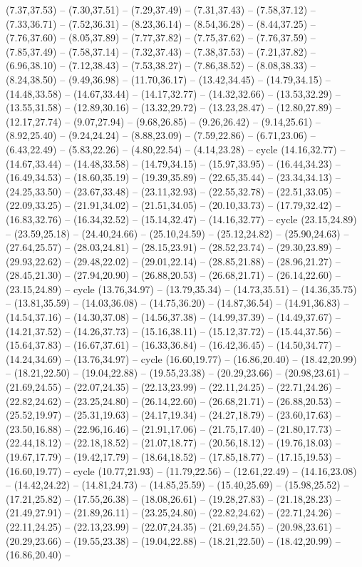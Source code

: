 {(7.37,37.53) -- (7.30,37.51) -- (7.29,37.49) -- (7.31,37.43) -- (7.58,37.12) -- (7.33,36.71) -- (7.52,36.31) -- (8.23,36.14) -- (8.54,36.28) -- (8.44,37.25) -- (7.76,37.60) -- (8.05,37.89) -- (7.77,37.82) -- (7.75,37.62) -- (7.76,37.59) -- (7.85,37.49) -- (7.58,37.14) -- (7.32,37.43) -- (7.38,37.53) -- (7.21,37.82) -- (6.96,38.10) -- (7.12,38.43) -- (7.53,38.27) -- (7.86,38.52) -- (8.08,38.33) -- (8.24,38.50) -- (9.49,36.98) -- (11.70,36.17) -- (13.42,34.45) -- (14.79,34.15) -- (14.48,33.58) -- (14.67,33.44) -- (14.17,32.77) -- (14.32,32.66) -- (13.53,32.29) -- (13.55,31.58) -- (12.89,30.16) -- (13.32,29.72) -- (13.23,28.47) -- (12.80,27.89) -- (12.17,27.74) -- (9.07,27.94) -- (9.68,26.85) -- (9.26,26.42) -- (9.14,25.61) -- (8.92,25.40) -- (9.24,24.24) -- (8.88,23.09) -- (7.59,22.86) -- (6.71,23.06) -- (6.43,22.49) -- (5.83,22.26) -- (4.80,22.54) -- (4.14,23.28) -- cycle (14.16,32.77) -- (14.67,33.44) -- (14.48,33.58) -- (14.79,34.15) -- (15.97,33.95) -- (16.44,34.23) -- (16.49,34.53) -- (18.60,35.19) -- (19.39,35.89) -- (22.65,35.44) -- (23.34,34.13) -- (24.25,33.50) -- (23.67,33.48) -- (23.11,32.93) -- (22.55,32.78) -- (22.51,33.05) -- (22.09,33.25) -- (21.91,34.02) -- (21.51,34.05) -- (20.10,33.73) -- (17.79,32.42) -- (16.83,32.76) -- (16.34,32.52) -- (15.14,32.47) -- (14.16,32.77) -- cycle (23.15,24.89) -- (23.59,25.18) -- (24.40,24.66) -- (25.10,24.59) -- (25.12,24.82) -- (25.90,24.63) -- (27.64,25.57) -- (28.03,24.81) -- (28.15,23.91) -- (28.52,23.74) -- (29.30,23.89) -- (29.93,22.62) -- (29.48,22.02) -- (29.01,22.14) -- (28.85,21.88) -- (28.96,21.27) -- (28.45,21.30) -- (27.94,20.90) -- (26.88,20.53) -- (26.68,21.71) -- (26.14,22.60) -- (23.15,24.89) -- cycle (13.76,34.97) -- (13.79,35.34) -- (14.73,35.51) -- (14.36,35.75) -- (13.81,35.59) -- (14.03,36.08) -- (14.75,36.20) -- (14.87,36.54) -- (14.91,36.83) -- (14.54,37.16) -- (14.30,37.08) -- (14.56,37.38) -- (14.99,37.39) -- (14.49,37.67) -- (14.21,37.52) -- (14.26,37.73) -- (15.16,38.11) -- (15.12,37.72) -- (15.44,37.56) -- (15.64,37.83) -- (16.67,37.61) -- (16.33,36.84) -- (16.42,36.45) -- (14.50,34.77) -- (14.24,34.69) -- (13.76,34.97) -- cycle (16.60,19.77) -- (16.86,20.40) -- (18.42,20.99) -- (18.21,22.50) -- (19.04,22.88) -- (19.55,23.38) -- (20.29,23.66) -- (20.98,23.61) -- (21.69,24.55) -- (22.07,24.35) -- (22.13,23.99) -- (22.11,24.25) -- (22.71,24.26) -- (22.82,24.62) -- (23.25,24.80) -- (26.14,22.60) -- (26.68,21.71) -- (26.88,20.53) -- (25.52,19.97) -- (25.31,19.63) -- (24.17,19.34) -- (24.27,18.79) -- (23.60,17.63) -- (23.50,16.88) -- (22.96,16.46) -- (21.91,17.06) -- (21.75,17.40) -- (21.80,17.73) -- (22.44,18.12) -- (22.18,18.52) -- (21.07,18.77) -- (20.56,18.12) -- (19.76,18.03) -- (19.67,17.79) -- (19.42,17.79) -- (18.64,18.52) -- (17.85,18.77) -- (17.15,19.53) -- (16.60,19.77) -- cycle (10.77,21.93) -- (11.79,22.56) -- (12.61,22.49) -- (14.16,23.08) -- (14.42,24.22) -- (14.81,24.73) -- (14.85,25.59) -- (15.40,25.69) -- (15.98,25.52) -- (17.21,25.82) -- (17.55,26.38) -- (18.08,26.61) -- (19.28,27.83) -- (21.18,28.23) -- (21.49,27.91) -- (21.89,26.11) -- (23.25,24.80) -- (22.82,24.62) -- (22.71,24.26) -- (22.11,24.25) -- (22.13,23.99) -- (22.07,24.35) -- (21.69,24.55) -- (20.98,23.61) -- (20.29,23.66) -- (19.55,23.38) -- (19.04,22.88) -- (18.21,22.50) -- (18.42,20.99) -- (16.86,20.40) -- }
